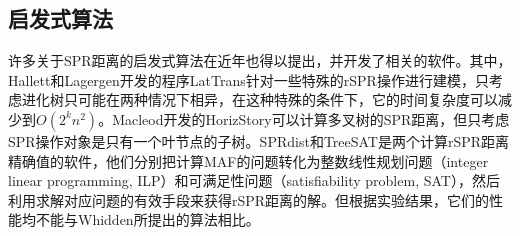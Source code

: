 \subsection{启发式算法}
许多关于SPR距离的启发式算法在近年也得以提出，并开发了相关的软件。其中，Hallett和Lagergen开发的程序LatTrans针对一些特殊的rSPR操作进行建模，只考虑进化树只可能在两种情况下相异，在这种特殊的条件下，它的时间复杂度可以减少到$O(2^kn^2)$。Macleod开发的HorizStory可以计算多叉树的SPR距离，但只考虑SPR操作对象是只有一个叶节点的子树。SPRdist和TreeSAT是两个计算rSPR距离精确值的软件，他们分别把计算MAF的问题转化为整数线性规划问题（integer linear programming, ILP）和可满足性问题（satisfiability problem, SAT），然后利用求解对应问题的有效手段来获得rSPR距离的解。但根据实验结果，它们的性能均不能与Whidden所提出的算法相比。






































